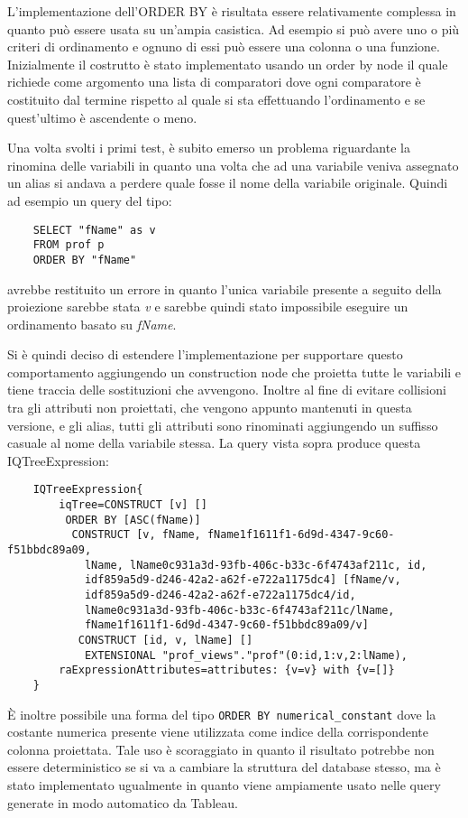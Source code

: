 L'implementazione dell'ORDER BY è risultata essere relativamente complessa in quanto può essere usata su un'ampia casistica. Ad esempio si può avere uno o più criteri di ordinamento e
ognuno di essi può essere una colonna o una funzione. Inizialmente il costrutto è stato implementato usando un order by node il quale richiede come argomento una lista di comparatori 
dove ogni comparatore è costituito dal termine rispetto al quale si sta effettuando l'ordinamento e se quest'ultimo è ascendente o meno. 

Una volta svolti i primi test, è subito emerso un problema riguardante la rinomina delle variabili in quanto una volta che ad una variabile veniva assegnato un alias si andava a perdere 
quale fosse il nome della variabile originale. Quindi ad esempio un query del tipo:
\begin{verbatim}
    SELECT "fName" as v
    FROM prof p 
    ORDER BY "fName"
\end{verbatim}
avrebbe restituito un errore in quanto l'unica variabile presente a seguito della proiezione sarebbe stata \textit{v} e sarebbe quindi stato impossibile eseguire un ordinamento basato su 
\textit{fName}.  

Si è quindi deciso di estendere l'implementazione per supportare questo comportamento aggiungendo un construction node che proietta tutte le variabili e tiene traccia delle sostituzioni che 
avvengono. Inoltre al fine di evitare collisioni tra gli attributi non proiettati, che vengono appunto mantenuti in questa versione, e gli alias, tutti gli attributi sono rinominati aggiungendo un 
suffisso casuale al nome della variabile stessa. La query vista sopra produce questa IQTreeExpression: 
\begin{verbatim}
    IQTreeExpression{
        iqTree=CONSTRUCT [v] []
         ORDER BY [ASC(fName)]
          CONSTRUCT [v, fName, fName1f1611f1-6d9d-4347-9c60-f51bbdc89a09, 
            lName, lName0c931a3d-93fb-406c-b33c-6f4743af211c, id, 
            idf859a5d9-d246-42a2-a62f-e722a1175dc4] [fName/v, 
            idf859a5d9-d246-42a2-a62f-e722a1175dc4/id, 
            lName0c931a3d-93fb-406c-b33c-6f4743af211c/lName, 
            fName1f1611f1-6d9d-4347-9c60-f51bbdc89a09/v]
           CONSTRUCT [id, v, lName] []
            EXTENSIONAL "prof_views"."prof"(0:id,1:v,2:lName), 
        raExpressionAttributes=attributes: {v=v} with {v=[]}
    } 
\end{verbatim}

\`E inoltre possibile una forma del tipo \verb+ORDER BY numerical_constant+ dove la costante numerica presente viene utilizzata come indice della corrispondente colonna proiettata. Tale
uso è scoraggiato in quanto il risultato potrebbe non essere deterministico se si va a cambiare la struttura del database stesso, ma è stato implementato ugualmente in quanto viene
ampiamente usato nelle query generate in modo automatico da Tableau.

